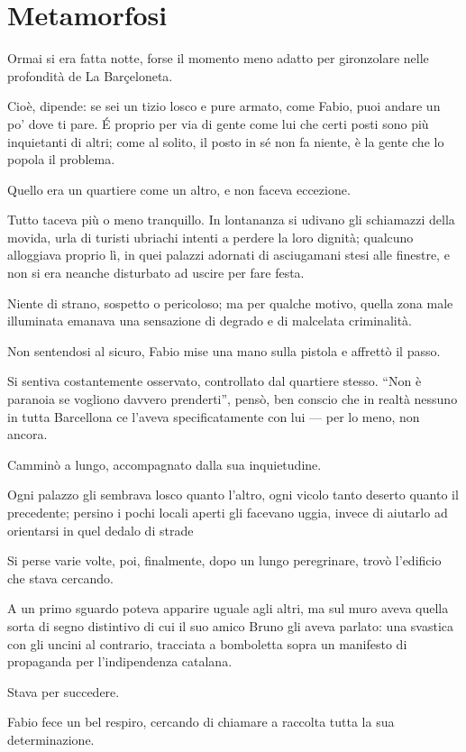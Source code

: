 \chapter{Metamorfosi}

Ormai si era fatta notte, forse il momento meno adatto per gironzolare nelle profondità de La Barçeloneta. 

Cioè, dipende: se sei un tizio losco e pure armato, come Fabio, puoi andare un po' dove ti pare. É proprio per via di gente come lui che certi posti sono più inquietanti di altri; come al solito, il posto in sé non fa niente, è la gente che lo popola il problema.

Quello era un quartiere come un altro, e non faceva eccezione.

Tutto taceva più o meno tranquillo. In lontananza si udivano gli schiamazzi della movida, urla di turisti ubriachi intenti a perdere la loro dignità; qualcuno alloggiava proprio lì, in quei palazzi adornati di asciugamani stesi alle finestre, e non si era neanche disturbato ad uscire per fare festa.

Niente di strano, sospetto o pericoloso; ma per qualche motivo, quella zona male illuminata emanava una sensazione di degrado e di malcelata criminalità.

Non sentendosi al sicuro, Fabio mise una mano sulla pistola e affrettò il passo. 

Si sentiva costantemente osservato, controllato dal quartiere stesso. ``Non è paranoia se vogliono davvero prenderti'', pensò, ben conscio che in realtà nessuno in tutta Barcellona ce l'aveva specificatamente con lui --- per lo meno, non ancora.

Camminò a lungo, accompagnato dalla sua inquietudine.

Ogni palazzo gli sembrava losco quanto l'altro, ogni vicolo tanto deserto quanto il precedente; persino i pochi locali aperti gli facevano uggia, invece di aiutarlo ad orientarsi in quel dedalo di strade 

Si perse varie volte, poi, finalmente, dopo un lungo peregrinare, trovò l'edificio che stava cercando. 

A un primo sguardo poteva apparire uguale agli altri, ma sul muro aveva quella sorta di segno distintivo di cui il suo amico Bruno gli aveva parlato: una svastica con gli uncini al contrario, tracciata a bomboletta sopra un manifesto di propaganda per l'indipendenza catalana.

Stava per succedere.

Fabio fece un bel respiro, cercando di chiamare a raccolta tutta la sua determinazione. 

